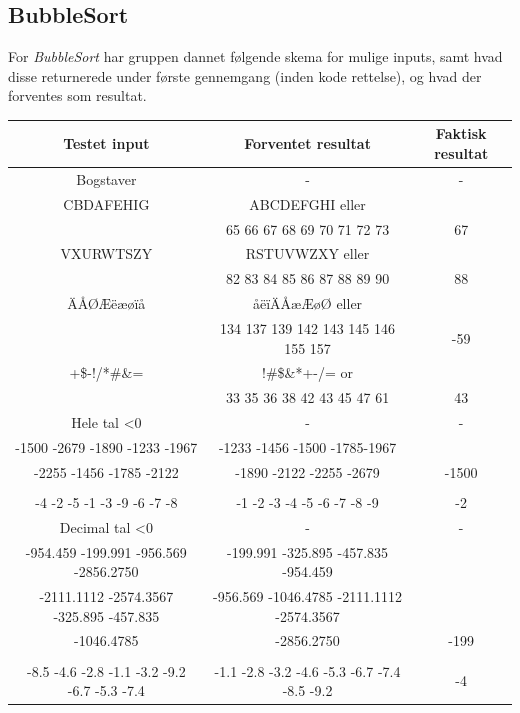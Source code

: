 \documentclass[11pt]{article}
\begin{document}
    \subsection{BubbleSort}\noindent
    For \textit{BubbleSort} har gruppen dannet følgende skema for mulige inputs, samt hvad disse returnerede under første gennemgang (inden kode rettelse), og hvad der forventes som resultat.
    \begin{center}
        \begin{tabular}{ |c|c|c| } 
            \hline
             Testet input & Forventet resultat & Faktisk resultat \\
            \hline
             Bogstaver & - & - \\
              CBDAFEHIG & ABCDEFGHI eller & \\ 
              &65 66 67 68 69 70 71 72 73 & 67 \\
              VXURWTSZY & RSTUVWZXY eller & \\ 
              & 82 83 84 85 86 87 88 89 90 & 88 \\
              ÄÅØÆëæøïå & åëïÄÅæÆøØ eller & \\ 
              & 134 137 139 142 143 145 146 155 157 & -59 \\
              +\$-!/*\#\&= & !\#\$\&*+-/= or & \\
              & 33 35 36 38 42 43 45 47 61 & 43 \\
             Hele tal \textless 0 & - & - \\
              -1500 -2679 -1890 -1233 -1967 & -1233 -1456 -1500 -1785-1967 & \\
              -2255 -1456 -1785 -2122 & -1890 -2122 -2255 -2679 & -1500\\ 
              &&\\
              -4 -2 -5 -1 -3 -9 -6 -7 -8 & -1 -2 -3 -4 -5 -6 -7 -8 -9 & -2\\ 
             Decimal tal \textless 0 & - & -\\
              -954.459 -199.991 -956.569 -2856.2750 & -199.991 -325.895 -457.835 -954.459 & \\
              -2111.1112 -2574.3567 -325.895 -457.835 & -956.569 -1046.4785 -2111.1112 -2574.3567 & \\ 
              -1046.4785 & -2856.2750 & -199 \\ 
              &&\\
              -8.5 -4.6 -2.8 -1.1 -3.2 -9.2 -6.7 -5.3 -7.4 & -1.1 -2.8 -3.2 -4.6 -5.3 -6.7 -7.4 -8.5 -9.2 & -4\\ 

\end{tabular}
\end{center}
\end{document}
